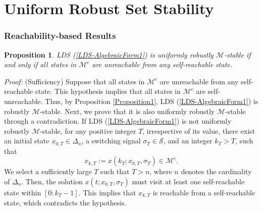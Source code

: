\documentclass[11pt,onecolumn]{article}
\newtheorem{proposition}{Proposition}
\begin{document}
\section{Uniform Robust Set Stability}\label{SectionUniformRobustStability}

\subsubsection{Reachability-based Results}

\begin{proposition}\label{Proposition3}
    LDS (\ref{LDS-AlgebraicForm1}) is uniformly robustly $\mathcal M$-stable if and only if all states in $\mathcal M^c$ are unreachable from any self-reachable state.
\end{proposition}

{\it Proof:\quad} (Sufficiency) Suppose that all states in $\mathcal M^c$ are unreachable from any self-reachable state. This hypothesis implies that all states in $\mathcal M^c$ are self-unreachable. Thus, by Proposition \ref{Proposition1}, LDS (\ref{LDS-AlgebraicForm1}) is robustly $\mathcal M$-stable. Next, we prove that it is also uniformly robustly $\mathcal M$-stable through a contradiction. If LDS (\ref{LDS-AlgebraicForm1}) is not uniformly robustly $\mathcal M$-stable, for any positive integer $T$, irrespective of its value, there exist an initial state $ x_{0,T}\in\Delta_n$, a switching signal $\sigma_T\in\mathcal S$, and an integer $k_T> T$, such that \[  x_{k,T}:= x(k_T; x_{0,T},\sigma_T)\in\mathcal M^c.\] We select a sufficiently large $T$ such that $T>n$, where $n$ denotes the cardinality of $\Delta_n$. Then, the solution $ x(t; x_{0,T},\sigma_T)$ must visit at least one self-reachable state within $[0:k_T-1]$.
 This implies that $ x_{k,T}$ is reachable from a self-reachable state, which contradicts the hypothesis.
\end{document}
